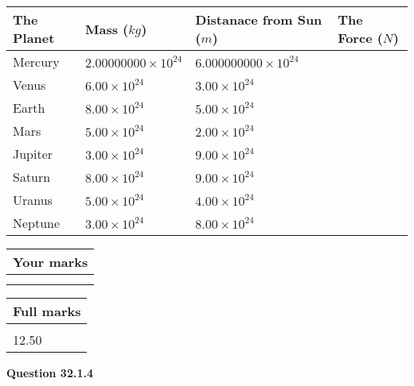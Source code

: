 \documentclass[12pt]{article}
\begin{document}
 
\begin{tabular}{|l|l|l|l|}
\hline
The Planet & Mass ($kg$) & Distanace from Sun ($m$) & The Force ($N$)\\
\hline
Mercury  &
           $ %
2.00000000 \times 10^{24} $   &
             $ %
6.000000000 \times 10^{24} $    &
\\  \hline
Venus    &
           $ %
6.00 \times 10^{24} $    &
             $ %
3.00 \times 10^{24} $    &
\\  \hline
Earth    &
           $ %
8.00 \times 10^{24} $    &
             $ %
5.00 \times 10^{24} $    &
\\   \hline
Mars     &
           $ %
5.00 \times 10^{24} $    &
             $ %
2.00 \times 10^{24} $    &
\\   \hline
Jupiter  &
           $ %
3.00 \times 10^{24} $    &
             $ %
9.00 \times 10^{24} $    &
\\  \hline
Saturn   &
           $ %
8.00 \times 10^{24}$    &
             $ %
9.00 \times 10^{24}$    &
\\  \hline
Uranus   &
           $ %
5.00 \times 10^{24} $    &
             $ %
4.00 \times 10^{24} $    &
\\  \hline
Neptune  &
           $ %
3.00 \times 10^{24} $    &
             $ %
8.00 \times 10^{24} $    &
\\  \hline
 
\end{tabular}
 
 

 
 

 
\vspace{0.3in}
  
\vspace{0.2in}
  
         \begin{tabular}{|l|}
\hline
 Your marks  \\
\hline
 \\ 
 \\ 
\hline
\end{tabular}
\hspace{0.05in} \begin{tabular}{|l|}
\hline
 Full marks  \\
\hline
 \\ 
12.50 \\
\hline
\end{tabular}
{\textbf{\Large{Question
32.1.4 
}}}
  
  
 
\end{document}
